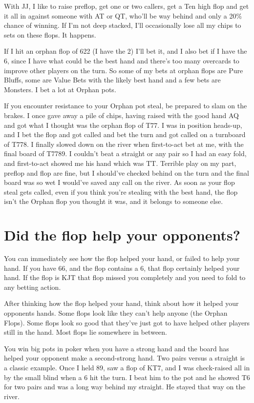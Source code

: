 With JJ, I like to raise preflop, get one or two callers, get a Ten
high flop and get it all in against someone with AT or QT, who'll be
way behind and only a 20\% chance of winning. If I'm not deep stacked,
I'll occasionally lose all my chips to sets on these flops. It happens.

If I hit an orphan flop of 622 (I have the 2) I'll
bet it, and I also bet if I have the 6, since I have
what could be the best hand and there's too many overcards to improve
other players on the turn. So some of my bets at orphan flops are
Pure Bluffs, some are Value Bets with the likely best hand and a few
bets are Monsters. I bet a lot at Orphan pots.

If you encounter resistance to your Orphan pot steal, be prepared
to slam on the brakes. I once gave away a pile of chips, having
raised with the good hand AQ and got what I thought was the orphan
flop of T77. I was in position heads-up, and I bet the flop and
got called and bet the turn and got called on a turnboard of T778.
I finally slowed down on the river when first-to-act bet at me,
with the final board of T7789. I couldn't beat a straight or any pair
so I had an easy fold, and first-to-act showed me his hand which was
TT. Terrible play on my part, preflop and flop are fine, but I
should've checked behind on the turn and the final board was so wet
I would've saved any call on the river. As soon as your flop
steal gets called, even if you think you're stealing with the best
hand, the flop isn't the Orphan flop you thought it was, and it
belongs to someone else.

\section{Did the flop help your opponents?}

You can immediately see how the flop helped your hand, or failed
to help your hand. If you have 66, and the flop contains
a 6, that flop certainly helped your hand. If the flop is KJT that
flop missed you completely and you need to fold to any betting action.

After thinking how the flop helped your hand, think about how
it helped your opponents hands. Some flops look like they can't
help anyone (the Orphan Flops). Some flops look so
good that they've just got to have helped other players still in
the hand. Most flops lie somewhere in between.

You win big pots in poker when you have a strong hand and the board
has helped your opponent make a second-strong hand. Two pairs
versus a straight is a classic example. Once I held 89, saw a flop
of KT7, and I was check-raised all in by the small blind when a 6 hit
the turn. I beat him to the pot and he showed T6 for two pairs and
was a long way behind my straight. He stayed that way on the river.

